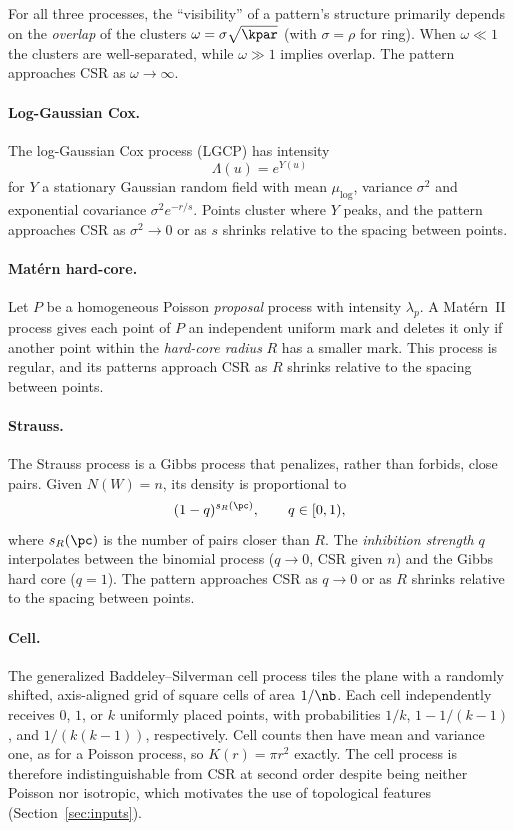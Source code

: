 For all three processes, the ``visibility'' of a pattern's structure primarily depends on the \emph{overlap} of the clusters 
$\omega=\sigma\sqrt{\kpar}$ (with $\sigma = \rho$ for ring). When $\omega\ll1$ the clusters are well-separated, while $\omega\gg1$ implies overlap. The pattern approaches CSR as $\omega\to\infty$.

\paragraph{Log-Gaussian Cox.}
The log-Gaussian Cox process (LGCP) has intensity
\[
    \Lambda(u)=e^{Y(u)}
\]
for $Y$ a stationary Gaussian random field with mean $\mu_{\log}$, variance $\sigma^2$ and exponential covariance $\sigma^2 e^{-r/s}$. Points cluster where $Y$ peaks, and the pattern approaches CSR as $\sigma^2\to0$ or as $s$ shrinks relative to the spacing between points.

\paragraph{Mat\'ern hard-core.}
Let $P$ be a homogeneous Poisson \emph{proposal} process with intensity $\lambda_p$. A Mat\'ern~II process gives each point of $P$ an independent uniform mark and deletes it only if another point within the \emph{hard-core radius} $R$ has a smaller mark. This process is regular, and its patterns approach CSR as $R$ shrinks relative to the spacing between points.

\paragraph{Strauss.}
The Strauss process is a Gibbs process that penalizes, rather than forbids, close pairs. Given $N(W)=n$, its density is proportional to
\[
  (1-q)^{s_R(\pc)}, \qquad q\in[0,1),
\]
where $s_R(\pc)$ is the number of pairs closer than $R$. The \emph{inhibition strength} $q$ interpolates between the binomial process ($q\to0$, CSR given $n$) and the Gibbs hard core ($q=1$). The pattern approaches CSR as $q\to0$ or as $R$ shrinks relative to the spacing between points.

\paragraph{Cell.}
The generalized Baddeley--Silverman cell process tiles the plane with a randomly shifted, axis-aligned grid of square
cells of area $1/\nb$. Each cell independently receives $0$, $1$, or $k$ uniformly placed points, with probabilities $1/k$, $1-1/(k-1)$, and $1/(k(k-1))$, respectively. Cell counts then have mean and variance one, as for a Poisson process, so $K(r)=\pi r^2$ exactly. The cell process is therefore indistinguishable from CSR at second order despite being neither Poisson nor isotropic, which motivates the use of topological features (Section~\ref{sec:inputs}).

